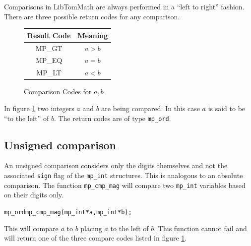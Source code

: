 \documentclass[synpaper]{book}
\begin{document}
Comparisons in LibTomMath are always performed in a ``left to right'' fashion.	There are three
possible return codes for any comparison.

  
\begin{figure}[h]
  \begin{center}
    \begin{tabular}{|c|c|}
      \hline \textbf{Result Code} & \textbf{Meaning} \\
      \hline MP\_GT               & $a > b$          \\
      \hline MP\_EQ               & $a = b$          \\
      \hline MP\_LT               & $a < b$          \\
      \hline
    \end{tabular}
  \end{center}
  \caption{Comparison Codes for $a, b$}
  \label{fig:CMP}
\end{figure}

In figure \ref{fig:CMP} two integers $a$ and $b$ are being compared.  In this case $a$ is said to
be ``to the left'' of $b$. The return codes are of type \texttt{mp\_ord}.

\subsection{Unsigned comparison}

An unsigned comparison considers only the digits themselves and not the associated \texttt{sign}
flag of the \texttt{mp\_int} structures.  This is analogous to an absolute comparison.	The
function \texttt{mp\_cmp\_mag} will compare two \texttt{mp\_int} variables based on their digits
only.

\begin{alltt}
mp_ord mp_cmp_mag(mp_int *a, mp_int *b);
\end{alltt}
This will compare $a$ to $b$ placing $a$ to the left of $b$.  This function cannot fail and will
return one of the three compare codes listed in figure \ref{fig:CMP}.
\end{document}
